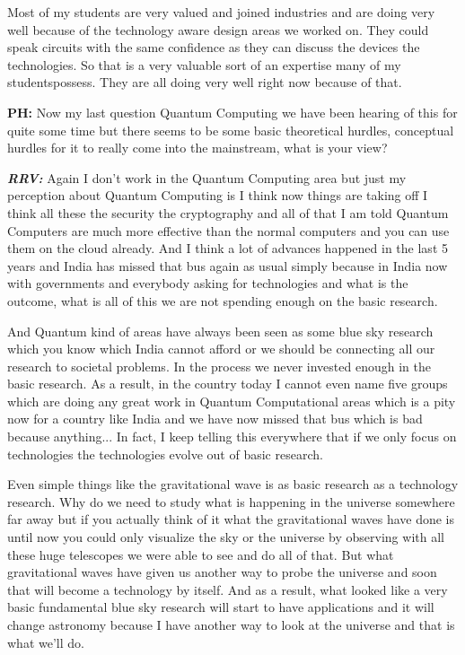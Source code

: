 Most of my students are very valued and joined industries and are doing very well because of the technology aware design areas we worked on. They could speak circuits with the same confidence as they can discuss the devices the technologies. So that is a very valuable sort of an expertise many of my studentspossess. They are all doing very well right now because of that.

\textbf{PH:} Now my last question Quantum Computing we have been hearing of this for quite some time but there seems to be some basic theoretical hurdles, conceptual hurdles for it to really come into the mainstream, what is your view?

\textbf{\textit{RRV:}} Again I don’t work in the Quantum Computing area but just my perception about Quantum Computing is I think now things are taking off I think all these the security the cryptography and all of that I am told Quantum Computers are much more effective than the normal computers and you can use them on the cloud already. And I think a lot of advances happened in the last 5 years and India has missed that bus again as usual simply because in India now with governments and everybody asking for technologies and what is the outcome, what is all of this we are not spending enough on the basic research.

And Quantum kind of areas have always been seen as some blue sky research which you know which India cannot afford or we should be connecting all our research to societal problems. In the process we never invested enough in the basic research. As a result, in the country today I cannot even name five groups which are doing any great work in Quantum Computational areas which is a pity now for a country like India and we have now missed that bus which is bad because anything... In fact, I keep telling this everywhere that if we only focus on technologies the technologies evolve out of basic research.

Even simple things like the gravitational wave is as basic research as a technology research. Why do we need to study what is happening in the universe somewhere far away but if you actually think of it what the gravitational waves have done is until now you could only visualize the sky or the universe by observing with all these huge telescopes we were able to see and do all of that. But what gravitational waves have given us another way to probe the universe and soon that will become a technology by itself. And as a result, what looked like a very basic fundamental blue sky research will start to have applications and it will change astronomy because I have another way to look at the universe and that is what we’ll do.

